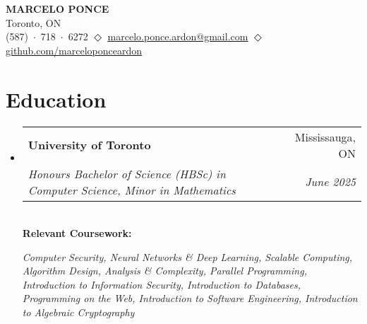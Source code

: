 \documentclass[letterpaper,11pt]{article}
\makeatletter
\newcommand{\resumeSubheading}[4]{
  \vspace{-2pt}\item
    \begin{tabular*}{0.97\textwidth}[t]{l@{\extracolsep{\fill}}r}
      \textbf{#1} & #2 \\
      \textit{\small#3} & \textit{\small #4} \\
    \end{tabular*}\vspace{-7pt}
}
\newcommand{\resumeSubHeadingListStart}{\begin{itemize}[leftmargin=0.15in, label={}]}
\newcommand{\resumeSubHeadingListEnd}{\end{itemize}}
\makeatother
\begin{document}

\begin{center}
    \textbf{\Huge \scshape MARCELO PONCE} \\ \vspace{1pt}
    \small Toronto, ON \\
    \small (587)~$\cdot$~718~$\cdot$~6272 $\Diamond$ \href{mailto:marcelo.ponce.ardon@gmail.com}{\underline{marcelo.ponce.ardon@gmail.com}} $\Diamond$
    \href{https://github.com/marceloponceardon}{\underline{github.com/marceloponceardon}}
\end{center}


\section{Education}
  \resumeSubHeadingListStart
    \resumeSubheading
      {University of Toronto}{Mississauga, ON}
      {Honours Bachelor of Science (HBSc) in Computer Science, Minor in Mathematics}{June 2025} \\
      \vspace{8pt}
      \textbf{Relevant Coursework:} \\
      {\it
	      Computer Security,
	      Neural Networks \& Deep Learning,
	      Scalable Computing,
	      Algorithm Design, Analysis \& Complexity,
	      Parallel Programming,
	      Introduction to Information Security,
	      Introduction to Databases,
	      Programming on the Web,
	      Introduction to Software Engineering,
	      Introduction to Algebraic Cryptography

      }
  \resumeSubHeadingListEnd
\end{document}
